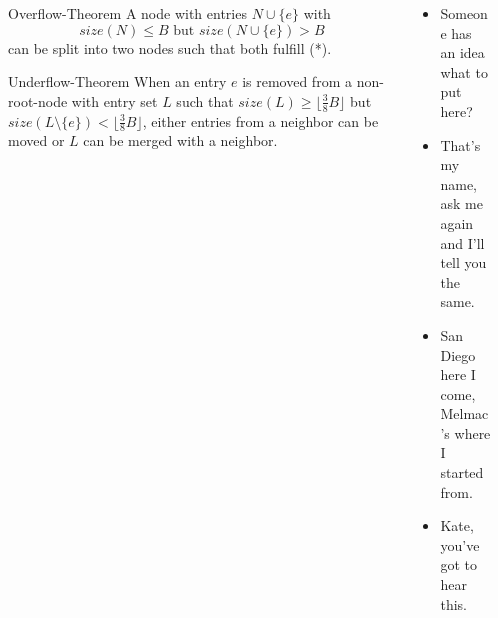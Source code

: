 \documentclass[mathserif]{beamer}
\begin{document}
\begin{frame}[t]{}
\begin{columns}[t]
\begin{column}{.27\linewidth}
    \begin{block}{Overflow-Theorem}
    A node with entries \mbox{$N \cup \{ e \}$} with
    \[ size(N) \leq B \text{ but } size(N \cup \{e\}) > B \]
    can be split into two nodes such that both fulfill (*).
    \end{block}

    \begin{block}{Underflow-Theorem}
    When an entry $e$ is removed from a non-root-node with entry set $L$ such
    that $size(L) \geq \lfloor \tfrac{3}{8} B \rfloor$ but
    $size(L \setminus \{e\}) < \lfloor \tfrac{3}{8} B \rfloor$, either
    entries from a neighbor can be moved or $L$ can be merged with a neighbor.
    \end{block}

\end{column}

\begin{column}{.27\linewidth}
    \vfill
    \Large
    \begin{itemize}
    \item Someone has an idea what to put here?
        \\
    \item That's my name,\\ask me again and I'll tell you the same.
        \\
    \item San Diego here I come,\\Melmac's where I started from.
        \\
    \item Kate, you've got to hear this.
    \end{itemize}
\end{column}

\begin{column}{.27\linewidth}

    \footnotesize


\end{column}
\end{columns}
\end{frame}
\end{document}
